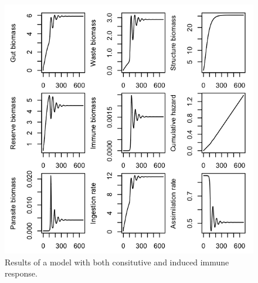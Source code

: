 \documentclass[12pt,reqno,final,pdftex]{amsart}\usepackage[]{graphicx}\usepackage[]{color}
\newenvironment{knitrout}{}{} %
\theoremstyle{plain}
\numberwithin{equation}{part}
\begin{document}
\begin{knitrout}\scriptsize
{}\color{fgcolor}\begin{figure}

\includegraphics[width=\linewidth]{figure/unnamed-chunk-3-1} \hfill{}

\caption[Results of a model with both consitutive and induced immune response]{Results of a model with both consitutive and induced immune response.\label{fig:unnamed-chunk-3}}
\end{figure}


\end{knitrout}



\end{document}
